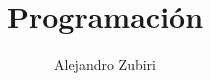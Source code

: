 \documentclass{article}
\author{Alejandro Zubiri}
\title{Programación}
\begin{document}
\maketitle
\tableofcontents
\pagebreak

\end{document}
